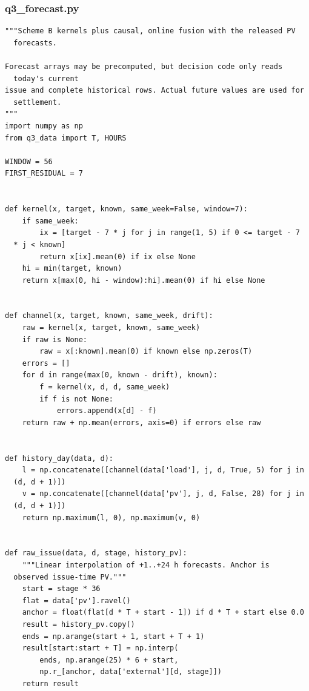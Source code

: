 \subsubsection*{q3\_forecast.py}
\begin{verbatim}
"""Scheme B kernels plus causal, online fusion with the released PV
  forecasts.

Forecast arrays may be precomputed, but decision code only reads
  today's current
issue and complete historical rows. Actual future values are used for
  settlement.
"""
import numpy as np
from q3_data import T, HOURS

WINDOW = 56
FIRST_RESIDUAL = 7


def kernel(x, target, known, same_week=False, window=7):
    if same_week:
        ix = [target - 7 * j for j in range(1, 5) if 0 <= target - 7
  * j < known]
        return x[ix].mean(0) if ix else None
    hi = min(target, known)
    return x[max(0, hi - window):hi].mean(0) if hi else None


def channel(x, target, known, same_week, drift):
    raw = kernel(x, target, known, same_week)
    if raw is None:
        raw = x[:known].mean(0) if known else np.zeros(T)
    errors = []
    for d in range(max(0, known - drift), known):
        f = kernel(x, d, d, same_week)
        if f is not None:
            errors.append(x[d] - f)
    return raw + np.mean(errors, axis=0) if errors else raw


def history_day(data, d):
    l = np.concatenate([channel(data['load'], j, d, True, 5) for j in
  (d, d + 1)])
    v = np.concatenate([channel(data['pv'], j, d, False, 28) for j in
  (d, d + 1)])
    return np.maximum(l, 0), np.maximum(v, 0)


def raw_issue(data, d, stage, history_pv):
    """Linear interpolation of +1..+24 h forecasts. Anchor is
  observed issue-time PV."""
    start = stage * 36
    flat = data['pv'].ravel()
    anchor = float(flat[d * T + start - 1]) if d * T + start else 0.0
    result = history_pv.copy()
    ends = np.arange(start + 1, start + T + 1)
    result[start:start + T] = np.interp(
        ends, np.arange(25) * 6 + start,
        np.r_[anchor, data['external'][d, stage]])
    return result



\end{verbatim}
